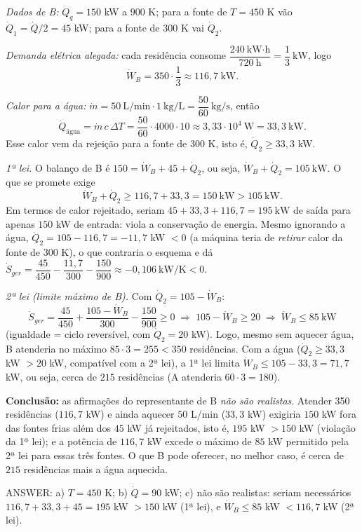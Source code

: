 \documentclass{article}%
\begin{document}
\emph{Dados de B:} $\dot Q_q=150$ kW a $900$ K; para a fonte de $T=450$ K vão $\dot Q_1=\dot Q/2 = 45$ kW; para a fonte de $300$ K vai $\dot Q_2$.

\emph{Demanda elétrica alegada:} cada residência consome $\dfrac{240\ \text{kW·h}}{720\ \text{h}}=\dfrac13\ \text{kW}$, logo
\[
\dot W_B = 350\cdot\frac13 \approx 116{,}7\ \text{kW}.
\]

\emph{Calor para a água:} $\dot m = 50\ \text{L/min}\cdot 1\ \text{kg/L}=\dfrac{50}{60}\ \text{kg/s}$, então
\[
\dot Q_{\text{água}}=\dot m\,c\,\Delta T=\frac{50}{60}\cdot 4000\cdot 10\approx 3{,}33\cdot 10^{4}\ \text{W}=33{,}3\ \text{kW}.
\]
Esse calor vem da rejeição para a fonte de $300$ K, isto é, $\dot Q_2\ge 33{,}3$ kW.

\emph{1ª lei.} O balanço de B é $150=\dot W_B+45+\dot Q_2$, ou seja, $\dot W_B+\dot Q_2=105\ \text{kW}$. O que se promete exige
\[
\dot W_B+\dot Q_2 \ge 116{,}7+33{,}3 = 150\ \text{kW} > 105\ \text{kW}.
\]
Em termos de calor rejeitado, seriam $45+33{,}3+116{,}7 = 195\ \text{kW}$ de saída para apenas $150$ kW de entrada: viola a conservação de energia. Mesmo ignorando a água, $\dot Q_2=105-116{,}7=-11{,}7$ kW $<0$ (a máquina teria de \emph{retirar} calor da fonte de $300$ K), o que contraria o esquema e dá $\dot S_{ger}=\dfrac{45}{450}-\dfrac{11{,}7}{300}-\dfrac{150}{900}\approx-0{,}106\ \text{kW/K}<0$.

\emph{2ª lei (limite máximo de B).} Com $\dot Q_2=105-\dot W_B$:
\[
\dot S_{ger}=\frac{45}{450}+\frac{105-\dot W_B}{300}-\frac{150}{900}\ge 0
\;\Rightarrow\; 105-\dot W_B\ge 20
\;\Rightarrow\; \dot W_B\le 85\ \text{kW}
\]
(igualdade = ciclo reversível, com $\dot Q_2=20$ kW). Logo, mesmo sem aquecer água, B atenderia no máximo $85\cdot 3 = 255<350$ residências. Com a água ($\dot Q_2\ge 33{,}3$ kW $>20$ kW, compatível com a 2ª lei), a 1ª lei limita $\dot W_B\le 105-33{,}3=71{,}7$ kW, ou seja, cerca de $215$ residências (A atenderia $60\cdot 3=180$).

\textbf{Conclusão:} as afirmações do representante de B \emph{não são realistas}. Atender 350 residências ($116{,}7$ kW) e ainda aquecer $50$ L/min ($33{,}3$ kW) exigiria $150$ kW fora das fontes frias além dos $45$ kW já rejeitados, isto é, $195$ kW $>150$ kW (violação da 1ª lei); e a potência de $116{,}7$ kW excede o máximo de $85$ kW permitido pela 2ª lei para essas três fontes. O que B pode oferecer, no melhor caso, é cerca de $215$ residências mais a água aquecida.

\medskip
ANSWER: a) $T=450$ K; b) $\dot Q=90$ kW; c) não são realistas: seriam necessários $116{,}7+33{,}3+45=195$ kW $>150$ kW (1ª lei), e $\dot W_B\le 85$ kW $<116{,}7$ kW (2ª lei).%
\newpage%
\end{document}
